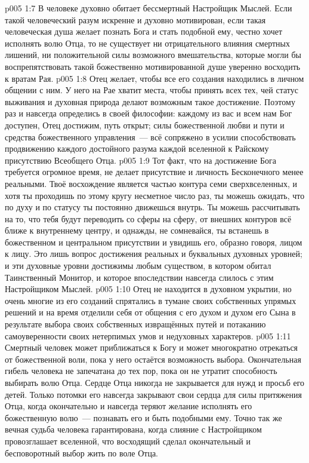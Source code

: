 \vs p005 1:7 В человеке духовно обитает бессмертный Настройщик Мыслей. Если такой человеческий разум искренне и духовно мотивирован, если такая человеческая душа желает познать Бога и стать подобной ему, честно хочет исполнять волю Отца, то не существует ни отрицательного влияния смертных лишений, ни положительной силы возможного вмешательства, которые могли бы воспрепятствовать такой божественно мотивированной душе уверенно восходить к вратам Рая.
\vs p005 1:8 Отец желает, чтобы все его создания находились в личном общении с ним. У него на Рае хватит места, чтобы принять всех тех, чей статус выживания и духовная природа делают возможным такое достижение. Поэтому раз и навсегда определись в своей философии: каждому из вас и всем нам Бог доступен, Отец достижим, путь открыт; силы божественной любви и пути и средства божественного управления~--- всё сопряжено в усилии способствовать продвижению каждого достойного разума каждой вселенной к Райскому присутствию Всеобщего Отца.
\vs p005 1:9 Тот факт, что на достижение Бога требуется огромное время, не делает присутствие и личность Бесконечного менее реальными. Твоё восхождение является частью контура семи сверхвселенных, и хотя ты проходишь по этому кругу несметное число раз, ты можешь ожидать, что по духу и по статусу ты постоянно движешься внутрь. Ты можешь рассчитывать на то, что тебя будут переводить со сферы на сферу, от внешних контуров всё ближе к внутреннему центру, и однажды, не сомневайся, ты встанешь в божественном и центральном присутствии и увидишь его, образно говоря, лицом к лицу. Это лишь вопрос достижения реальных и буквальных духовных уровней; и эти духовные уровни достижимы любым существом, в котором обитал Таинственный Монитор, и которое впоследствии навсегда слилось с этим Настройщиком Мыслей.
\vs p005 1:10 \pc Отец не находится в духовном укрытии, но очень многие из его созданий спрятались в тумане своих собственных упрямых решений и на время отделили себя от общения с его духом и духом его Сына в результате выбора своих собственных извращённых путей и потаканию самоуверенности своих нетерпимых умов и недуховных характеров.
\vs p005 1:11 Смертный человек может приближаться к Богу и может многократно отрекаться от божественной воли, пока у него остаётся возможность выбора. Окончательная гибель человека не запечатана до тех пор, пока он не утратит способность выбирать волю Отца. Сердце Отца никогда не закрывается для нужд и просьб его детей. Только потомки его навсегда закрывают свои сердца для силы притяжения Отца, когда окончательно и навсегда теряют желание исполнять его божественную волю~--- познавать его и быть подобными ему. Точно так же вечная судьба человека гарантирована, когда слияние с Настройщиком провозглашает вселенной, что восходящий сделал окончательный и бесповоротный выбор жить по воле Отца.

